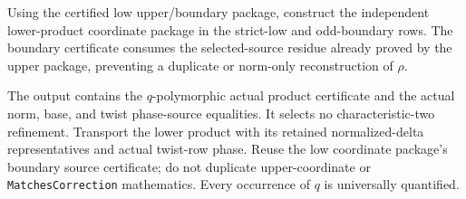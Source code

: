 \begin{theorem}
\label{mod:cases-wildquadratic-lowproductcoordinatetransport}
Using the certified low upper/boundary package, construct the independent
lower-product coordinate package in the strict-low and odd-boundary rows.
The boundary certificate consumes the selected-source residue already proved
by the upper package, preventing a duplicate or norm-only reconstruction of
\(\rho\).

The output contains the \(q\)-polymorphic actual product certificate and the
actual norm, base, and twist phase-source equalities.  It selects no
characteristic-two refinement.
\leanok
{}
\FormalizationContract
Transport the lower product with its retained normalized-delta representatives
and actual twist-row phase.  Reuse the low coordinate package's boundary
source certificate; do not duplicate upper-coordinate or
\texttt{MatchesCorrection} mathematics.  Every occurrence of \(q\) is
universally quantified.
\end{theorem}
